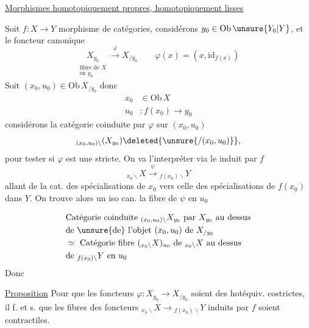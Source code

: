 \uline{Morphismes homotopiquement propres, homotopiquement lisses}

Soit $f:X\to Y$ morphisme de catégories, considérons $y_0\in\mathrm{Ob}\,\unsure{Y_0|Y}$, et le foncteur canonique
\[
 \underset{\substack{\text{fibre de }X\\\text{en }y_0}}{X_{y_0}}\xrightarrow{\varphi}X_{/y_0}
 \qquad \varphi(x)=(x,\mathrm{id}_{f(x)})\tag*{(1)}
\]
Soit $(x_0,u_0)\in\mathrm{Ob}\,X_{/y_0}$ donc
\[
 \begin{aligned}x_0&\in\mathrm{Ob}\,X\\u_0&:f(x_0)\to y_0\end{aligned}
\]
considérons la catégorie coinduite par $\varphi$ sur $(x_0,u_0)$
\[
 {}_{(x_0,u_0)\backslash}(X_{y_0})\deleted{\unsure{/(x_0,u_0)}},
\]
pour tester si $\varphi$ est une   stricte.  On va l'interpréter via le   induit par $f$
\[
 {}_{x_0\backslash}X\xrightarrow{\psi}{}_{f(x_0)\backslash}Y
\]
allant de la cat. des spécialisations de $x_0$  vers celle des spécialisations de $f(x_0)$ dans $Y$. On trouve alors un iso can.  la fibre de $\psi$ en $u_0$

\[
 \begin{aligned}
 &\text{Catégorie coinduite }{}_{(x_0,u_0)\backslash} X_{y_0}\text{ par }X_{y_0}\text{ au dessus}\\
 &\text{de \unsure{de} l'objet }(x_0,u_0)\text{ de }X_{/y_0}\\
 &\simeq\text{ Catégorie fibre }({}_{x_0\backslash}X)_{u_0}\text{ de }{}_{x_0\backslash}X\text{ au dessus}\\
 &\text{de } {}_{f(x_0)\backslash}Y\text{ en }u_0
 \end{aligned}
\]
Donc

\uline{Proposition} Pour que les foncteurs $\varphi:X_{y_0}\to X_{/y_0}$  soient des hotéquiv. costrictes, il f. et s. que les fibres des foncteurs ${}_{x_0\backslash}X\longrightarrow {}_{f(x_0)\backslash}Y$ induits par $f$ soient contractiles.
